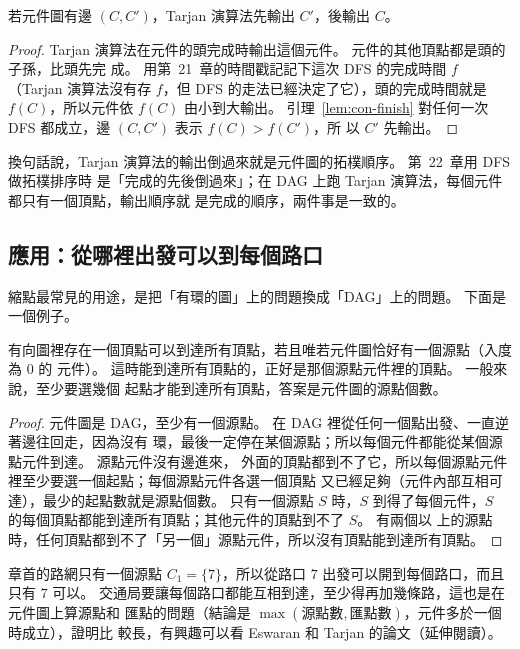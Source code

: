 \begin{theorem}
\label{thm:con-tarjan-order}
若元件圖有邊 $(C, C')$，Tarjan 演算法先輸出 $C'$，後輸出 $C$。
\end{theorem}

\begin{proof}
Tarjan 演算法在元件的頭完成時輸出這個元件。 元件的其他頂點都是頭的子孫，比頭先完
成。 用第~21~章的時間戳記記下這次 DFS 的完成時間 $f$（Tarjan 演算法沒有存 $f$，但
DFS 的走法已經決定了它），頭的完成時間就是 $f(C)$，所以元件依 $f(C)$ 由小到大輸出。
引理~\ref{lem:con-finish} 對任何一次 DFS 都成立，邊 $(C, C')$ 表示 $f(C) > f(C')$，所
以 $C'$ 先輸出。
\end{proof}

換句話說，Tarjan 演算法的輸出倒過來就是元件圖的拓樸順序。 第~22~章用 DFS 做拓樸排序時
是「完成的先後倒過來」；在 DAG 上跑 Tarjan 演算法，每個元件都只有一個頂點，輸出順序就
是完成的順序，兩件事是一致的。

\subsection{應用：從哪裡出發可以到每個路口}

縮點最常見的用途，是把「有環的圖」上的問題換成「DAG」上的問題。 下面是一個例子。

\begin{theorem}
\label{thm:con-source}
有向圖裡存在一個頂點可以到達所有頂點，若且唯若元件圖恰好有一個源點（入度為 $0$ 的
元件）。 這時能到達所有頂點的，正好是那個源點元件裡的頂點。 一般來說，至少要選幾個
起點才能到達所有頂點，答案是元件圖的源點個數。
\end{theorem}

\begin{proof}
元件圖是 DAG，至少有一個源點。 在 DAG 裡從任何一個點出發、一直逆著邊往回走，因為沒有
環，最後一定停在某個源點；所以每個元件都能從某個源點元件到達。 源點元件沒有邊進來，
外面的頂點都到不了它，所以每個源點元件裡至少要選一個起點；每個源點元件各選一個頂點
又已經足夠（元件內部互相可達），最少的起點數就是源點個數。 只有一個源點 $S$ 時，$S$
到得了每個元件，$S$ 的每個頂點都能到達所有頂點；其他元件的頂點到不了 $S$。 有兩個以
上的源點時，任何頂點都到不了「另一個」源點元件，所以沒有頂點能到達所有頂點。
\end{proof}

章首的路網只有一個源點 $C_1 = \{7\}$，所以從路口 $7$ 出發可以開到每個路口，而且只有
$7$ 可以。 交通局要讓每個路口都能互相到達，至少得再加幾條路，這也是在元件圖上算源點和
匯點的問題（結論是 $\max(\text{源點數}, \text{匯點數})$，元件多於一個時成立），證明比
較長，有興趣可以看 Eswaran 和 Tarjan 的論文（延伸閱讀）。

